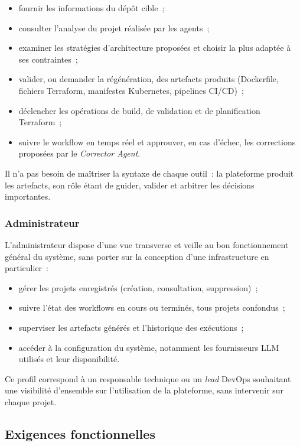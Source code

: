 \begin{itemize}
    \item fournir les informations du dépôt cible~;
    \item consulter l'analyse du projet réalisée par les agents~;
    \item examiner les stratégies d'architecture proposées et choisir la plus adaptée à
    ses contraintes~;
    \item valider, ou demander la régénération, des artefacts produits (Dockerfile,
    fichiers Terraform, manifestes Kubernetes, pipelines CI/CD)~;
    \item déclencher les opérations de build, de validation et de planification
    Terraform~;
    \item suivre le workflow en temps réel et approuver, en cas d'échec, les corrections
    proposées par le \textit{Corrector Agent}.
\end{itemize}

Il n'a pas besoin de maîtriser la syntaxe de chaque outil~: la plateforme produit les
artefacts, son rôle étant de guider, valider et arbitrer les décisions importantes.

\subsubsection{Administrateur}

L'administrateur dispose d'une vue transverse et veille au bon fonctionnement général du
système, sans porter sur la conception d'une infrastructure en particulier~:

\begin{itemize}
    \item gérer les projets enregistrés (création, consultation, suppression)~;
    \item suivre l'état des workflows en cours ou terminés, tous projets confondus~;
    \item superviser les artefacts générés et l'historique des exécutions~;
    \item accéder à la configuration du système, notamment les fournisseurs LLM utilisés
    et leur disponibilité.
\end{itemize}

Ce profil correspond à un responsable technique ou un \textit{lead} DevOps souhaitant une
visibilité d'ensemble sur l'utilisation de la plateforme, sans intervenir sur chaque
projet.

\subsection{Exigences fonctionnelles}


